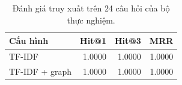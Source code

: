 \begin{table}[H]\centering\small
\caption{Đánh giá truy xuất trên 24 câu hỏi của bộ thực nghiệm.}
\begin{tabular}{@{}lrrr@{}}\toprule
Cấu hình & Hit@1 & Hit@3 & MRR \\\midrule
TF-IDF & 1.0000 & 1.0000 & 1.0000 \\
TF-IDF + graph & 1.0000 & 1.0000 & 1.0000 \\
\bottomrule\end{tabular}
\end{table}
